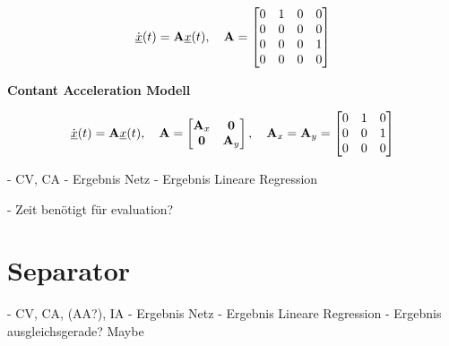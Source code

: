 \begin{equation*} \label{eq:speedCV}
    \dot{{\underline{x}}}(t) = {{\mathbf{A}}}{\underline{x}}(t), \quad {\ensuremath{{\mathbf{A}}}} = 
    \begin{bmatrix}
        0 & 1 & 0 & 0 \\
        0 & 0 & 0 & 0 \\
        0 & 0 & 0 & 1\\
        0 & 0 & 0 & 0
    \end{bmatrix} 
\end{equation*}


\textbf{Contant Acceleration Modell}

\begin{align*} \label{eq:speedCV}
    \dot{{\underline{x}}}(t) = {{\mathbf{A}}}{\underline{x}}(t), \quad {\ensuremath{{\mathbf{A}}}} = 
    \begin{bmatrix}
        {\ensuremath{{\mathbf{A}}}}_x & \boldsymbol{0} \\
        \boldsymbol{0} & {{\mathbf{A}}}_y
    \end{bmatrix} 
    , \quad
    {\ensuremath{{\mathbf{A}}}}_x = {{\mathbf{A}}}_y = 
    \begin{bmatrix}
        0 & 1 & 0 \\
        0 & 0 & 1 \\
        0 & 0 & 0
    \end{bmatrix} 
\end{align*}


- CV, CA
- Ergebnis Netz
- Ergebnis Lineare Regression

- Zeit benötigt für evaluation?

\section{Separator}

- CV, CA, (AA?), IA
- Ergebnis Netz
- Ergebnis Lineare Regression
- Ergebnis ausgleichsgerade? Maybe